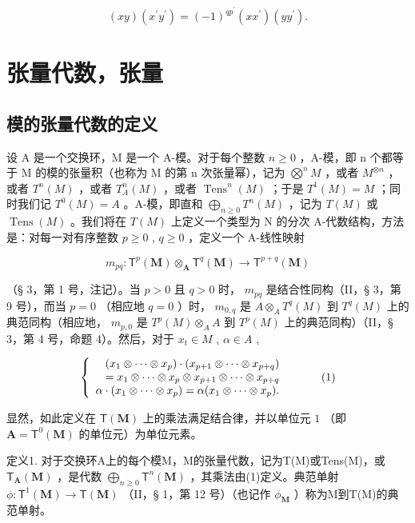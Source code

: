 \[
(x y) (x ^ {\prime} y ^ {\prime}) = (- 1) ^ {q p ^ {\prime}} (x x ^ {\prime}) (y y ^ {\prime}).
\]

\section{张量代数，张量}

\subsection{模的张量代数的定义}

设 A 是一个交换环，M 是一个 A-模。对于每个整数 \(n \geqslant 0\) ，A-模，即 n 个都等于 M 的模的张量积（也称为 M 的第 n 次张量幂），记为 \(\bigotimes^{n} M\) ，或者 \(M^{\otimes n}\) ，或者 \(T^{n}(M)\) ，或者 \(T_{A}^{n}(M)\) ，或者 \(\operatorname{Tens}^{n}(M)\) ；于是 \(T^{1}(M) = M\) ；同时我们记 \(T^{0}(M) = A\) 。A-模，即直和 \(\bigoplus_{n \geqslant 0} T^{n}(M)\) ，记为 \(T(M)\) 或 \(\operatorname{Tens}(M)\) 。我们将在 \(T(M)\) 上定义一个类型为 N 的分次 A-代数结构，方法是：对每一对有序整数 \(p \geqslant 0\) , \(q \geqslant 0\) ，定义一个 A-线性映射

\[
m _ {p q} \colon \mathsf {T} ^ {p} (\mathbf {M}) \otimes_ {\mathbf {A}} \mathsf {T} ^ {q} (\mathbf {M}) \rightarrow \mathsf {T} ^ {p + q} (\mathbf {M})
\]

（§ 3，第 1 号，注记）。当 \(p > 0\) 且 \(q > 0\) 时， \(m_{pq}\) 是结合性同构（II，§ 3，第 9 号），而当 \(p = 0\) （相应地 \(q = 0\) ）时， \(m_{0,q}\) 是 \(A \otimes_A T^q(M)\) 到 \(T^q(M)\) 上的典范同构（相应地， \(m_{p,0}\) 是 \(T^p(M) \otimes_A A\) 到 \(T^p(M)\) 上的典范同构）（II，§ 3，第 4 号，命题 4）。然后，对于 \(x_t \in M\) , \(\alpha \in A\) ,

\[
\left\{ \begin{array}{r l} (x _ {1} \otimes \dots \otimes x _ {p}) \cdot (x _ {p + 1} \otimes \dots \otimes x _ {p + q}) & \\ = x _ {1} \otimes \dots \otimes x _ {p} \otimes x _ {p + 1} \otimes \dots \otimes x _ {p + q} \\ \alpha \cdot (x _ {1} \otimes \dots \otimes x _ {p}) = \alpha (x _ {1} \otimes \dots \otimes x _ {p}). \end{array} \right.\tag{1}
\]

显然，如此定义在 \(\mathsf{T}(\mathbf{M})\) 上的乘法满足结合律，并以单位元 \(1\) （即 \(\mathbf{A} = \mathsf{T}^0 (\mathbf{M})\) 的单位元）为单位元素。

定义1. 对于交换环A上的每个模M，M的张量代数，记为T(M)或Tens(M)，或 \(\mathsf{T}_{\mathbf{A}}(\mathbf{M})\) ，是代数 \(\bigoplus_{n\geqslant 0}\mathsf{T}^n (\mathbf{M})\) ，其乘法由(1)定义。典范单射 \(\phi :\mathsf{T}^{1}(\mathbf{M})\to \mathsf{T}(\mathbf{M})\) （II，§ 1，第 12 号）（也记作 \(\phi_{\mathbf{M}}\) ）称为M到T(M)的典范单射。

